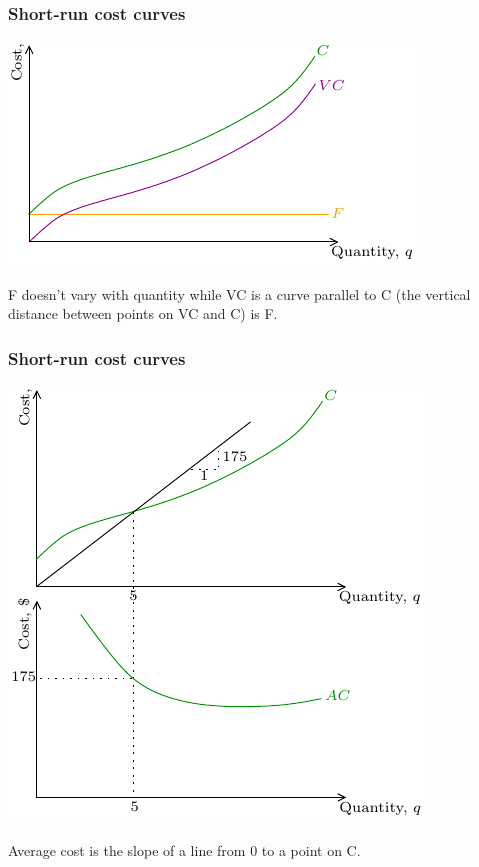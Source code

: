 \documentclass[xcolor=pdftex,dvipsnames]{beamer}
\begin{document}
\begin{frame}
\frametitle{Short-run cost curves}
\begin{center}
\includegraphics{pics/ShortRunCC2}
\end{center}
F doesn't vary with quantity while  VC is a curve  parallel to C (the
vertical distance between points on VC and C) is F.
\end{frame}



\begin{frame}
\frametitle{Short-run cost curves}
\begin{center}
\includegraphics{pics/ShortRunCC3}
\end{center}
Average cost  is the slope of a line from 0 to a point on C.
\end{frame}
\end{document}
